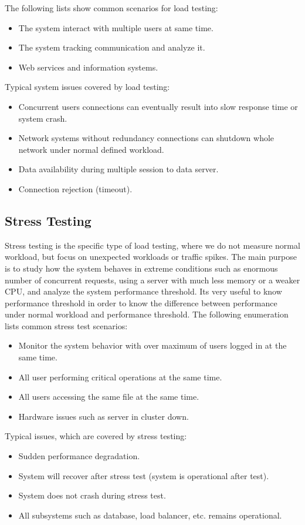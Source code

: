 The following lists show common scenarios for load testing:
\begin{itemize}
	\setlength\itemsep{0em}
	\item The system interact with multiple users at same time.
	\item The system tracking communication and analyze it.
	\item Web services and information systems.
\end{itemize}
Typical system issues covered by load testing:
\begin{itemize}
	\setlength\itemsep{0em}
	\item Concurrent users connections can eventually result into slow response time or system crash.
	\item Network systems without redundancy connections can shutdown whole network under normal defined workload.
	\item Data availability during multiple session to data server.
	\item Connection rejection (timeout).
\end{itemize}

\subsection*{Stress Testing}
\label{Stress Testing}
Stress testing is the specific type of load testing, where we do not measure normal workload, but focus on unexpected workloads or traffic spikes. The main purpose is to study how the system behaves in extreme conditions such as enormous number of concurrent requests, using a server with much less memory or a weaker CPU, and analyze the system performance threshold. Its very useful to know performance threshold in order to know the difference between performance under normal workload and performance threshold. The following enumeration lists common stress test scenarios:
\begin{itemize}
	\setlength\itemsep{0em}
	\item Monitor the system behavior with over maximum of users logged in at the same time.
	\item All user performing critical operations at the same time.
	\item All users accessing the same file at the same time.
	\item Hardware issues such as server in cluster down.
\end{itemize}
Typical issues, which are covered by stress testing:
\begin{itemize}
	\setlength\itemsep{0em}
	\item Sudden performance degradation.
	\item System will recover after stress test (system is operational after test).
	\item System does not crash during stress test.
	\item All subsystems such as database, load balancer, etc. remains operational.
\end{itemize}

